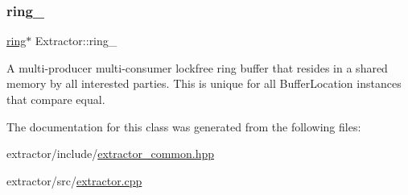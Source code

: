 \subsubsection{\texorpdfstring{ring\+\_\+}{ring\_}}
{\footnotesize\ttfamily \hyperlink{structring}{ring}$\ast$ Extractor\+::ring\+\_\+\hspace{0.3cm}{\ttfamily [private]}}

A multi-\/producer multi-\/consumer lockfree ring buffer that resides in a shared memory by all interested parties. This is unique for all Buffer\+Location instances that compare equal. 

The documentation for this class was generated from the following files\+:\begin{DoxyCompactItemize}
\item 
extractor/include/\hyperlink{extractor__common_8hpp}{extractor\+\_\+common.\+hpp}\item 
extractor/src/\hyperlink{extractor_8cpp}{extractor.\+cpp}\end{DoxyCompactItemize}
